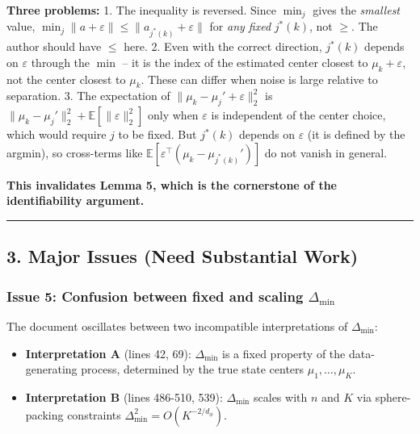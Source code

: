 \documentclass[
  12pt,
]{article}
\providecommand{\tightlist}{%
  \setlength{\itemsep}{0pt}\setlength{\parskip}{0pt}}
\begin{document}
\textbf{Three problems:} 1. The inequality is reversed. Since \(\min_j\)
gives the \emph{smallest} value,
\(\min_j \|a + \varepsilon\| \leq \|a_{j^*(k)} + \varepsilon\|\) for
\emph{any fixed} \(j^*(k)\), not \(\geq\). The author should have
\(\leq\) here. 2. Even with the correct direction, \(j^*(k)\) depends on
\(\varepsilon\) through the \(\min\) -- it is the index of the estimated
center closest to \(\mu_k + \varepsilon\), not the center closest to
\(\mu_k\). These can differ when noise is large relative to separation.
3. The expectation of \(\|\mu_k - \mu_j' + \varepsilon\|_2^2\) is
\(\|\mu_k - \mu_j'\|_2^2 + \mathbb{E}[\|\varepsilon\|_2^2]\) only when
\(\varepsilon\) is independent of the center choice, which would require
\(j\) to be fixed. But \(j^*(k)\) depends on \(\varepsilon\) (it is
defined by the argmin), so cross-terms like
\(\mathbb{E}[\varepsilon^\top(\mu_k - \mu_{j^*(k)}')]\) do not vanish in
general.

\textbf{This invalidates Lemma 5, which is the cornerstone of the
identifiability argument.}

\begin{center}\rule{0.5\linewidth}{0.5pt}\end{center}

\subsection{3. Major Issues (Need Substantial
Work)}\label{major-issues-need-substantial-work}

\subsubsection{\texorpdfstring{Issue 5: Confusion between fixed and
scaling
\(\Delta_{\min}\)}{Issue 5: Confusion between fixed and scaling \textbackslash Delta\_\{\textbackslash min\}}}\label{issue-5-confusion-between-fixed-and-scaling-delta_min}

The document oscillates between two incompatible interpretations of
\(\Delta_{\min}\):

\begin{itemize}
\tightlist
\item
  \textbf{Interpretation A} (lines 42, 69): \(\Delta_{\min}\) is a fixed
  property of the data-generating process, determined by the true state
  centers \(\mu_1, \dots, \mu_K\).
\item
  \textbf{Interpretation B} (lines 486-510, 539): \(\Delta_{\min}\)
  scales with \(n\) and \(K\) via sphere-packing constraints
  \(\Delta_{\min}^2 = O(K^{-2/d_\phi})\).
\end{itemize}
\end{document}
